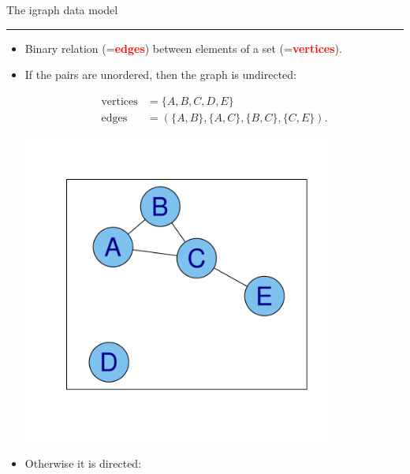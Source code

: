 \documentclass[landscape,fleqno]{foils}
\newcommand{\stitle}[1]{{\color{blue}\Large #1\par\vspace*{10pt}\hrule}}
\renewcommand{\emph}[1]{\textcolor{red}{\bf #1}}
\begin{document}
\newpage
\stitle{The igraph data model}
\begin{itemize}
\item Binary relation (=\emph{edges}) between elements of a set
  (=\emph{vertices}). \pause\\[-15pt]
\item If the pairs are unordered, then the graph is undirected:\\[-20pt]

  \begin{minipage}{0.7\textwidth}
    \begin{align} 
      \text{vertices} & =\{A,B,C,D,E\} \nonumber\\
      \text{edges}    & =( \{A,B\},\{A,C\},\{B,C\},\{C,E\} ). \nonumber
    \end{align}
  \end{minipage}\begin{minipage}{0.3\textwidth}
    \includegraphics[width=0.8\textwidth]{../images/small3}
  \end{minipage}\pause
\item Otherwise it is directed:\\[-20pt]


\end{itemize}
\end{document}
